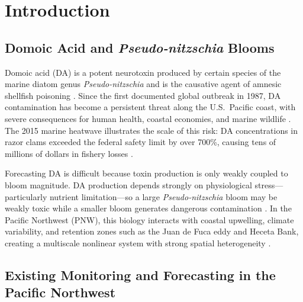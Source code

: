 \documentclass[toxins,article,submit,moreauthors]{Definitions/mdpi}
\begin{document}
\section{Introduction}
\label{sec:introduction}

\subsection{Domoic Acid and \textit{Pseudo-nitzschia} Blooms}
\label{sec:intro-biology}

Domoic acid (DA) is a potent neurotoxin produced by certain species of the marine diatom genus \textit{Pseudo-nitzschia} and is the causative agent of amnesic shellfish poisoning \cite{Bates2018, Trainer2012, Wright1989}. Since the first documented global outbreak in 1987, DA contamination has become a persistent threat along the U.S.\ Pacific coast, with severe consequences for human health, coastal economies, and marine wildlife \cite{Mos2001, Lefebvre2010, Trainer2012}. The 2015 marine heatwave illustrates the scale of this risk: DA concentrations in razor clams exceeded the federal safety limit by over 700\%, causing tens of millions of dollars in fishery losses \cite{McCabe2016, Bond2015, Trainer2020}.

Forecasting DA is difficult because toxin production is only weakly coupled to bloom magnitude. DA production depends strongly on physiological stress---particularly nutrient limitation---so a large \textit{Pseudo-nitzschia} bloom may be weakly toxic while a smaller bloom generates dangerous contamination \cite{Trick2010, Marchetti2004, Lelong2012}. In the Pacific Northwest (PNW), this biology interacts with coastal upwelling, climate variability, and retention zones such as the Juan de Fuca eddy and Heceta Bank, creating a multiscale nonlinear system with strong spatial heterogeneity \cite{Trainer2002, Trainer2009, McKibben2017, Jacox2018}.

\subsection{Existing Monitoring and Forecasting in the Pacific Northwest}
\label{sec:intro-monitoring}
\end{document}
